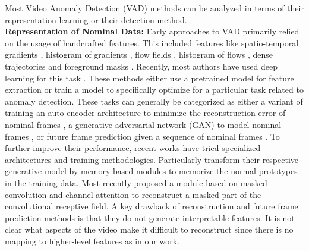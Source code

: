 Most Video Anomaly Detection (VAD) methods can be analyzed in terms of their representation learning or their detection method.
\\
\textbf{Representation of Nominal Data:}  Early approaches to VAD \cite{adam2008robust, antic2011video, cong2013abnormal, li2013anomaly, mehran2009abnormal, saligrama2012video, wu2010chaotic} primarily relied on the usage of handcrafted features. This included features like spatio-temporal gradients \cite{lu2013abnormal, ionescu2019detecting}, histogram of gradients \cite{saligrama2012video, ma2015anomaly}, flow fields \cite{adam2008robust, antic2011video, wu2010chaotic, mehran2009abnormal},  histogram of flows \cite{saligrama2010video,saligrama2012video,cong2013abnormal}, dense trajectories \cite{ma2015anomaly, stauffer2000learning} and foreground masks \cite{antic2011video}. Recently, most authors have used deep learning for this task \cite{doshi2020any, doshi2020continual, hasan2016learning, hinami2017joint, ionescu2019object, liu2018future, luo2017revisit, ramachandra2020learning, ravanbakhsh2017abnormal, ravanbakhsh2018plug, smeureanu2017deep, wang2018abnormal, sabokrou2017deep, 10.1016/j.cviu.2016.10.010}. These methods either use a pretrained model \cite{smeureanu2017deep, ionescu2019detecting, hinami2017joint, ravanbakhsh2018plug, luo2017revisit, sabokrou2017deep} for feature extraction or train a model to specifically optimize for a particular task related to anomaly detection. These tasks can generally be categorized as either a variant of training an auto-encoder architecture to minimize the reconstruction error of nominal frames \cite{hasan2016learning,ionescu2019object,nguyen2019anomaly,chang2020clustering,lu2020few,liu2021hybrid}, a generative adversarial network (GAN) to model nominal frames \cite{liu2018future, lu2020few}, or future frame prediction given a sequence of nominal frames \cite{liu2018future,wang2021prediction}.  To further improve their performance, recent works have tried specialized architectures and training methodologies. Particularly \cite{dong2020dual, liu2021hybrid, park2020learning} transform their respective generative model by memory-based modules to memorize the normal prototypes in the training data. Most recently \cite{ristea2021self} proposed a module based on masked convolution and channel attention  to  reconstruct  a  masked  part  of  the  convolutional receptive field.  A key drawback of reconstruction and future frame prediction methods is that they do not generate interpretable features. It is not clear what aspects of the video make it difficult to reconstruct since there is no mapping to higher-level features as in our work.
